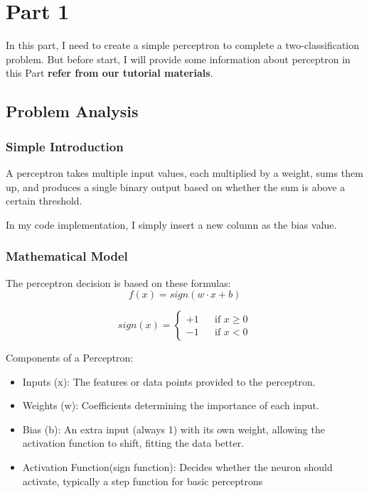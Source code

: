 \section{Part 1}

In this part, I need to create a simple perceptron to complete a two-classification problem.
But before start, I will provide some information about perceptron in this Part
\textbf{refer from our tutorial materials}.

\subsection{Problem Analysis}

\subsubsection{Simple Introduction}

A perceptron takes multiple input values, each multiplied by a weight, sums them up,
and produces a single binary output based on whether the sum is above a certain threshold.

In my code implementation, I simply insert a new column as the bias value.


\subsubsection{Mathematical Model}

The perceptron decision is based on these formulas:
$$
    f(x) = sign(w\cdot x+b)
$$

$$
sign(x)=
\left\{
    \begin{aligned}
        +1 && \text{if $x \geq 0$}\\
        -1 && \text{if $x < 0$}
    \end{aligned}
\right.
$$

Components of a Perceptron:

\begin{itemize}
    \item Inputs (x): The features or data points provided to the perceptron.
    \item Weights (w): Coefficients determining the importance of each input.
    \item {Bias (b):
    An extra input (always 1) with its own weight, allowing the activation function to shift, fitting the data better.
    }
    \item {Activation Function(sign function):
    Decides whether the neuron should activate, typically a step function for basic perceptrons
    }
\end{itemize}

